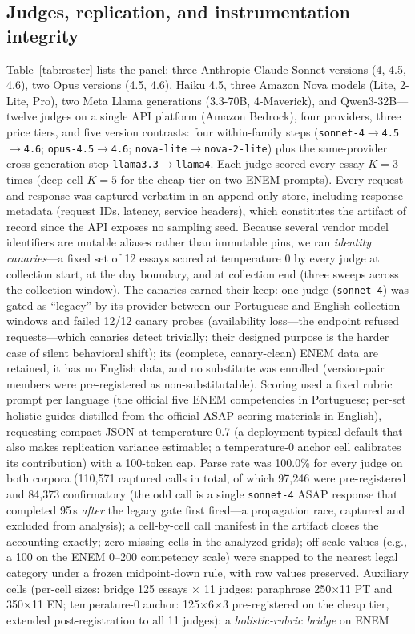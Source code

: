 \documentclass[fleqn,10pt]{JLA_article}
\begin{document}
\subsection{Judges, replication, and instrumentation integrity}

Table~\ref{tab:roster} lists the panel: three Anthropic Claude Sonnet versions (4, 4.5, 4.6), two Opus versions (4.5, 4.6), Haiku 4.5, three Amazon Nova models (Lite, 2-Lite, Pro), two Meta Llama generations (3.3-70B, 4-Maverick), and Qwen3-32B---twelve judges on a single API platform (Amazon Bedrock), four providers, three price tiers, and five version contrasts: four within-family steps (\texttt{sonnet-4}$\to$\texttt{4.5}$\to$\texttt{4.6}; \texttt{opus-4.5}$\to$\texttt{4.6}; \texttt{nova-lite}$\to$\texttt{nova-2-lite}) plus the same-provider cross-generation step \texttt{llama3.3}$\to$\texttt{llama4}. Each judge scored every essay $K{=}3$ times (deep cell $K{=}5$ for the cheap tier on two ENEM prompts). Every request and response was captured
verbatim in an append-only store, including response metadata (request IDs, latency, service
headers), which constitutes the artifact of record since the API exposes no sampling seed.
Because several vendor model identifiers are mutable aliases rather than immutable pins, we ran
\emph{identity canaries}---a fixed set of 12 essays scored at temperature 0 by every judge at
collection start, at the day boundary, and at collection end (three sweeps across the collection window). The canaries earned their keep: one judge
(\texttt{sonnet-4}) was gated as ``legacy'' by its provider between our Portuguese and English
collection windows and failed 12/12 canary probes (availability loss---the endpoint refused requests---which canaries detect trivially; their designed purpose is the harder case of silent behavioral shift); its (complete, canary-clean) ENEM data are
retained, it has no English data, and no substitute was enrolled (version-pair members were
pre-registered as non-substitutable). Scoring used a fixed rubric prompt per language (the official five ENEM competencies in Portuguese; per-set holistic guides distilled from the official ASAP scoring materials in English), requesting compact JSON at temperature 0.7 (a deployment-typical default that also makes replication variance estimable; a temperature-0 anchor cell calibrates its contribution) with a 100-token cap. Parse rate was 100.0\% for every judge on both corpora (110{,}571 captured calls in total, of which 97{,}246 were pre-registered and 84{,}373 confirmatory (the odd call is a single \texttt{sonnet-4} ASAP response that completed 95\,s \emph{after} the legacy gate first fired---a propagation race, captured and excluded from analysis); a cell-by-cell call manifest in the artifact closes the accounting exactly; zero missing cells in the analyzed grids); off-scale values (e.g., a 100 on the ENEM 0--200 competency scale) were snapped to the nearest legal category under a frozen midpoint-down rule, with raw values preserved. Auxiliary cells (per-cell sizes: bridge 125 essays $\times$ 11 judges; paraphrase 250$\times$11 PT and 350$\times$11 EN; temperature-0 anchor: 125$\times$6$\times$3 pre-registered on the cheap tier, extended post-registration to all 11 judges): a \emph{holistic-rubric bridge} on ENEM
\end{document}
